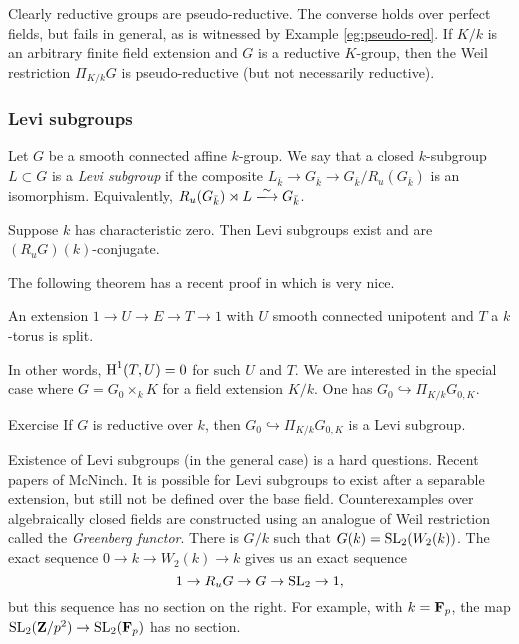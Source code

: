 Clearly reductive groups are pseudo-reductive. The converse holds over 
perfect fields, but fails in general, as is witnessed by 
Example \ref{eg:pseudo-red}. If $K/k$ is an arbitrary finite field 
extension and $G$ is a reductive $K$-group, then the Weil restriction 
$\Pi_{K/k} G$ is pseudo-reductive (but not necessarily reductive). 


\subsubsection{Levi subgroups}

Let $G$ be a smooth connected affine $k$-group. We say that a closed 
$k$-subgroup $L\subset G$ is a \emph{Levi subgroup} if the composite 
$L_{\bar k} \to G_{\bar k} \to G_{\bar k}/R_u(G_{\bar k})$ is an 
isomorphism. Equivalently, 
$R_u(G_{\bar k})\rtimes L\isomorphism G_{\bar k}$. 

\begin{theo}[Mostow]
Suppose $k$ has characteristic zero. Then Levi subgroups exist and are 
$(R_uG)(k)$-conjugate. 
\end{theo}

The following theorem has a recent proof in \cite{demarche} which is very nice. 

\begin{theo}[SGA 3]
An extension $1 \to U \to E\to T\to 1$ with $U$ smooth connected unipotent and 
$T$ a $k$-torus is split. 
\end{theo}

In other words, $\operatorname{H}^1(T,U)=0$ for such $U$ and $T$. We are interested in the 
special case where $G=G_0\times_k K$ for a field extension $K/k$. 
One has $G_0\hookrightarrow \Pi_{K/k} G_{0,K}$. 

\begin{enonce}[remark]{Exercise}
If $G$ is reductive over $k$, then $G_0\hookrightarrow \Pi_{K/k} G_{0,K}$ is a 
Levi subgroup. 
\end{enonce}


Existence of Levi subgroups (in the general case) is a hard questions. Recent 
papers of McNinch. It is possible for Levi subgroups to exist after a 
separable extension, but still not be defined over the base field. Counterexamples 
over algebraically closed fields are constructed using an analogue of Weil 
restriction called the \emph{Greenberg functor}. There is $G/k$ such that 
$G(k)=\operatorname{SL}_2(W_2(k))$. The exact sequence 
$0 \to k \to W_2(k) \to k$ gives us an exact sequence 
\[
  1 \to R_u G \to G \to \operatorname{SL}_2 \to 1 ,
\]
but this sequence has no section on the right. For example, with 
$k=\mathbf{F}_p$, the map $\operatorname{SL}_2(\mathbf{Z}/p^2) \to \operatorname{SL}_2(\mathbf{F}_p)$ has 
no section. 

